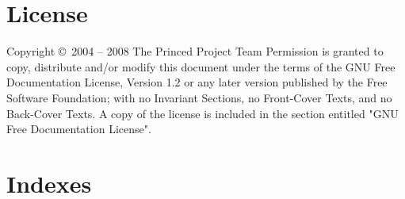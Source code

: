 \documentclass{article}
\begin{document}
\pagebreak[3]
\section{License}

      Copyright \copyright \ 2004 -- 2008 The Princed Project Team
\bigskip
      Permission is granted to copy, distribute and/or modify this document
      under the terms of the GNU Free Documentation License, Version 1.2
      or any later version published by the Free Software Foundation;
      with no Invariant Sections, no Front-Cover Texts, and no Back-Cover
      Texts.  A copy of the license is included in the section entitled
      "GNU Free Documentation License".

\section*{Indexes}
\listoftables
\listoffigures
\printindex
\end{document}

